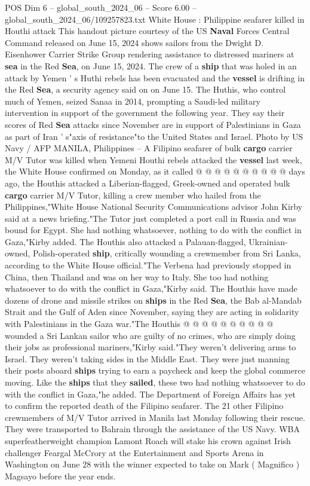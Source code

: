 \begin{textsample}{POS Dim 6 – global\_south\_2024\_06 – Score 6.00 – global\_south\_2024\_06/109257823.txt}  \label{ex:f6_pos_177}
White House : Philippine seafarer killed in Houthi attack This handout picture courtesy of the US \textbf{Naval} Forces Central Command released on June 15, 2024 shows sailors from the Dwight D.
Eisenhower Carrier Strike Group rendering assistance to distressed mariners at \textbf{sea} in the Red \textbf{Sea}, on June 15, 2024.
The crew of a \textbf{ship} that was holed in an attack by Yemen ' s Huthi rebels has been evacuated and the \textbf{vessel} is drifting in the Red \textbf{Sea}, a security agency said on on June 15.
The Huthis, who control much of Yemen, seized Sanaa in 2014, prompting a Saudi-led military intervention in support of the government the following year.
They say their scores of Red \textbf{Sea} attacks since November are in support of Palestinians in Gaza as part of Iran ' s"axis of resistance"to the United States and Israel.
Photo by US Navy / AFP MANILA, Philippines -- A Filipino seafarer of bulk \textbf{cargo} carrier M/V Tutor was killed when Yemeni Houthi rebels attacked the \textbf{vessel} last week, the White House confirmed on Monday, as it called @ @ @ @ @ @ @ @ @ @ days ago, the Houthis attacked a Liberian-flagged, Greek-owned and operated bulk \textbf{cargo} carrier M/V Tutor, killing a crew member who hailed from the Philippines,"White House National Security Communications advisor John Kirby said at a news briefing."The Tutor just completed a port call in Russia and was bound for Egypt.
She had nothing whatsoever, nothing to do with the conflict in Gaza,"Kirby added.
The Houthis also attacked a Palauan-flagged, Ukrainian-owned, Polish-operated \textbf{ship}, critically wounding a crewmember from Sri Lanka, according to the White House official."The Verbena had previously stopped in China, then Thailand and was on her way to Italy.
She too had nothing whatsoever to do with the conflict in Gaza,"Kirby said.
The Houthis have made dozens of drone and missile strikes on \textbf{ships} in the Red \textbf{Sea}, the Bab al-Mandab Strait and the Gulf of Aden since November, saying they are acting in solidarity with Palestinians in the Gaza war."The Houthis @ @ @ @ @ @ @ @ @ @ wounded a Sri Lankan sailor who are guilty of no crimes, who are simply doing their jobs as professional mariners,"Kirby said."They weren't delivering arms to Israel.
They weren't taking sides in the Middle East.
They were just manning their posts aboard \textbf{ships} trying to earn a paycheck and keep the global commerce moving.
Like the \textbf{ships} that they \textbf{sailed}, these two had nothing whatsoever to do with the conflict in Gaza,"he added.
The Department of Foreign Affairs has yet to confirm the reported death of the Filipino seafarer.
The 21 other Filipino crewmembers of M/V Tutor arrived in Manila last Monday following their rescue.
They were transported to Bahrain through the assistance of the US Navy.
WBA superfeatherweight champion Lamont Roach will stake his crown against Irish challenger Feargal McCrory at the Entertainment and Sports Arena in Washington on June 28 with the winner expected to take on Mark ( Magnifico ) Magsayo before the year ends.

\end{textsample}
